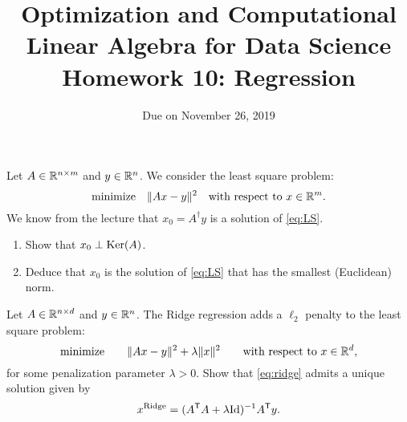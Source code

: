 \documentclass[11pt,nocut]{article}
\title{\vspace{-2.0cm}%
	Optimization and Computational Linear Algebra for Data Science\\
Homework 10: Regression}
\date{\vspace{-1cm}Due on November 26, 2019}
\begin{document}
\maketitle


\vspace{1mm}



\begin{problem}[2 points]
	Let $A \in \mathbb{R}^{n \times m}$ and $y \in \mathbb{R}^n$. We consider the least square problem:
	\begin{equation}\label{eq:LS}
		\text{minimize} \quad \|Ax-y\|^2 \quad \text{with respect to} \ x \in \R^m.
	\end{equation}
	We know from the lecture that $x_0 = A^{\dagger}y$ is a solution of \eqref{eq:LS}. 
	\begin{enumerate}[label=\normalfont(\textbf{\alph*})]
		\item Show that $x_0 \perp {{\rm Ker}}(A)$.
		\item Deduce that $x_0$ is the solution of \eqref{eq:LS} that has the smallest (Euclidean) norm.
	\end{enumerate}
\end{problem}

\vspace{4mm}

\begin{problem}[2 points]
	Let $A \in \mathbb{R}^{n \times d}$ and $y \in \mathbb{R}^n$.
	The Ridge regression adds a $\ell_2$ penalty to the least square problem:
	\begin{equation}\label{eq:ridge}
		\text{minimize} \qquad
		\| Ax - y \|^2 + \lambda \|x\|^2 \qquad \text{with respect to} \ x \in \R^d,
	\end{equation}
	for some penalization parameter $\lambda >0$.
	Show that \eqref{eq:ridge} admits a unique solution given by
	$$
	x^{\rm Ridge} = (A^{{\sf T}} A + \lambda {{\rm Id}})^{-1} A^{{\sf T}} y.
	$$
\end{problem}


\vspace{4mm}
\end{document}
